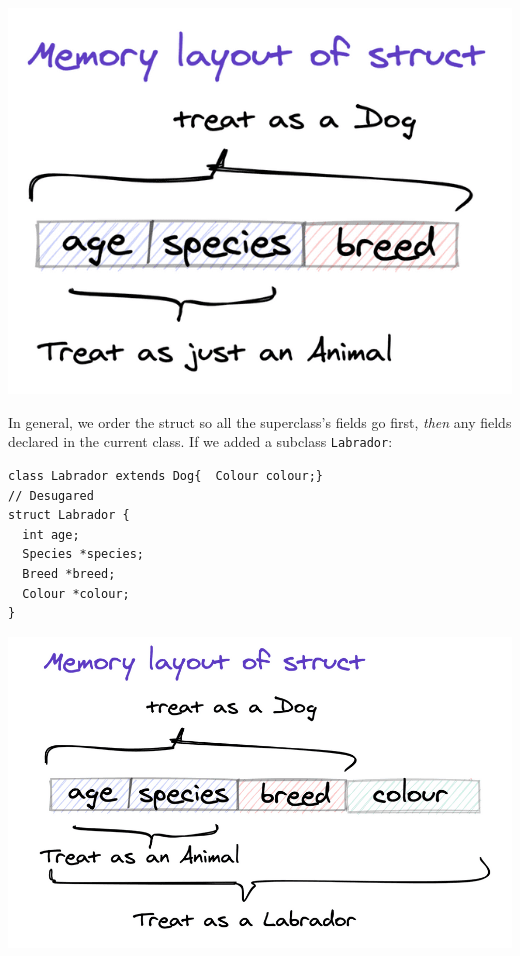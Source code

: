 {
\href{https://mukulrathi.com/static/a759ba239e743d4372cd86fb6e9bc856/8affb/inheritance-struct.png}{{}
\includegraphics[width=\linewidth]{11_files/inheritance-struct.png}} }

In general, we order the struct so all the superclass's fields go first,
\emph{then} any fields declared in the current class. If we added a
subclass \texttt{Labrador}:


\begin{verbatim}
class Labrador extends Dog{  Colour colour;}
// Desugared
struct Labrador {
  int age;
  Species *species;
  Breed *breed;
  Colour *colour;
}
\end{verbatim}

{
\href{https://mukulrathi.com/static/2ee5657d689e2e35a975960beace0cbb/a9577/another-inheritance-struct.png}{{}
\includegraphics[width=\linewidth]{11_files/another-inheritance-struct.png}} }


